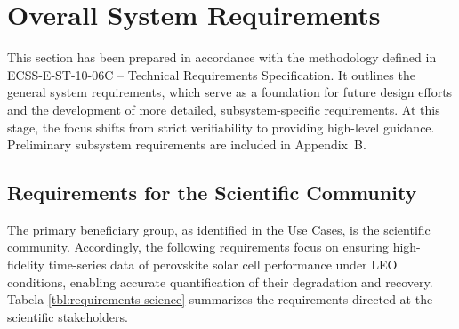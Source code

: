 \chapter{Overall System Requirements}
\label{chpt:overall-system-requirements}

This section has been prepared in accordance with the methodology defined in ECSS-E-ST-10-06C – Technical Requirements Specification. It outlines the general system requirements, which serve as a foundation for future design efforts and the development of more detailed, subsystem-specific requirements. At this stage, the focus shifts from strict verifiability to providing high-level guidance. Preliminary subsystem requirements are included in Appendix~B.

\section{Requirements for the Scientific Community}
The primary beneficiary group, as identified in the Use Cases, is the scientific community. 
Accordingly, the following requirements focus on ensuring high-fidelity time-series data of perovskite solar cell performance under LEO conditions, 
enabling accurate quantification of their degradation and recovery.
Tabela \ref{tbl:requirements-science} summarizes the requirements directed at the scientific stakeholders.

